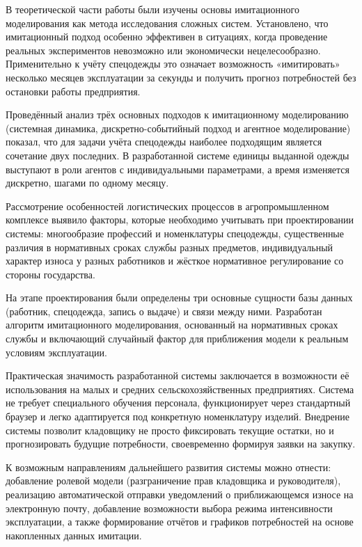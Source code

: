\documentclass[14pt,a4paper]{extreport}
\begin{document}
\begin{singlespacing}
	В теоретической части работы были изучены основы имитационного моделирования как метода исследования сложных систем. Установлено, что имитационный подход особенно эффективен в ситуациях, когда проведение реальных экспериментов невозможно или экономически нецелесообразно. Применительно к учёту спецодежды это означает возможность «имитировать» несколько месяцев эксплуатации за секунды и получить прогноз потребностей без остановки работы предприятия.
	
	Проведённый анализ трёх основных подходов к имитационному моделированию (системная динамика, дискретно-событийный подход и агентное моделирование) показал, что для задачи учёта спецодежды наиболее подходящим является сочетание двух последних. В разработанной системе единицы выданной одежды выступают в роли агентов с индивидуальными параметрами, а время изменяется дискретно, шагами по одному месяцу.
	
	Рассмотрение особенностей логистических процессов в агропромышленном комплексе выявило факторы, которые необходимо учитывать при проектировании системы: многообразие профессий и номенклатуры спецодежды, существенные различия в нормативных сроках службы разных предметов, индивидуальный характер износа у разных работников и жёсткое нормативное регулирование со стороны государства.
	
	На этапе проектирования были определены три основные сущности базы данных (работник, спецодежда, запись о выдаче) и связи между ними. Разработан алгоритм имитационного моделирования, основанный на нормативных сроках службы и включающий случайный фактор для приближения модели к реальным условиям эксплуатации.
	
	Практическая значимость разработанной системы заключается в возможности её использования на малых и средних сельскохозяйственных предприятиях. Система не требует специального обучения персонала, функционирует через стандартный браузер и легко адаптируется под конкретную номенклатуру изделий. Внедрение системы позволит кладовщику не просто фиксировать текущие остатки, но и прогнозировать будущие потребности, своевременно формируя заявки на закупку.
	
	К возможным направлениям дальнейшего развития системы можно отнести: добавление ролевой модели (разграничение прав кладовщика и руководителя), реализацию автоматической отправки уведомлений о приближающемся износе на электронную почту, добавление возможности выбора режима интенсивности эксплуатации, а также формирование отчётов и графиков потребностей на основе накопленных данных имитации.
	

\end{singlespacing}
\end{document}
